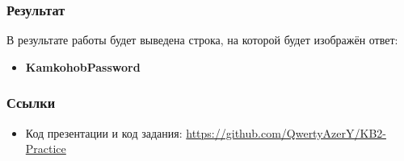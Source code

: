 \documentclass[t]{beamer}
\begin{document}
\begin{frame}[c]
	\begin{block}{}
    \frametitle{Результат}
		 {В результате работы будет выведена строка, на которой будет изображён ответ:}
	\end{block}
    \begin{itemize}
		\item \textbf{KamkohobPassword}
	\end{itemize}
\end{frame}

\begin{frame}[c]
    \frametitle{Ссылки}
	\begin{itemize}
		\item Код презентации и код задания: \href{https://github.com/QwertyAzerY/KB2-Practice}{https://github.com/QwertyAzerY/KB2-Practice}
	\end{itemize}	
\end{frame}

\frame[plain]{\titlepage}
\end{document}
